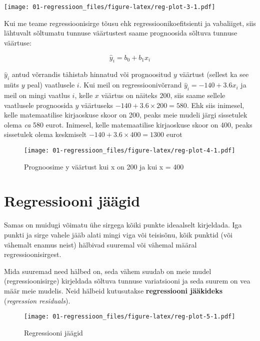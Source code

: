 \documentclass[
]{book}
\begin{document}
\texttt{[image: 01-regressioon\_files/figure-latex/reg-plot-3-1.pdf]}

Kui me teame regressioonisirge tõusu ehk regressioonikoefitsienti ja vabaliiget, siis lähtuvalt sõltumatu tunnuse väärtustest saame prognoosida sõltuva tunnuse väärtuse:

\begin{equation}
  \hat{y}_i=b_0+b_1x_i
\end{equation}

\(\hat{y}_i\) antud võrrandis tähistab hinnatud või prognoositud \(y\) väärtust (sellest ka see müts \(y\) peal) vaatlusele \(i\). Kui meil on regressioonivõrrand \(\hat{y}_i=-140+3.6x_i\) ja meil on mingi vaatlus \(i\), kelle \(x\) väärtus on näiteks \(200\), siis saame sellele vaatlusele prognoosida \(y\) väärtuseks \(-140+3.6\times200=580\). Ehk siis inimesel, kelle matemaatilise kirjaoskuse skoor on 200, peaks meie mudeli järgi sissetulek olema \emph{ca} 580 eurot. Inimesel, kelle matemaatilise kirjaoskuse skoor on 400, peaks sissetulek olema keskmiselt \(-140+3.6\times400=1300\) eurot

\begin{figure}
\centering
\texttt{[image: 01-regressioon\_files/figure-latex/reg-plot-4-1.pdf]}
\caption{\label{fig:reg-plot-4}Prognoosime y väärtust kui x on 200 ja kui x = 400}
\end{figure}

\hypertarget{regressiooni-juxe4uxe4gid}{%
\section{Regressiooni jäägid}\label{regressiooni-juxe4uxe4gid}}

Samas on muidugi võimatu ühe sirgega kõiki punkte ideaalselt kirjeldada. Iga punkti ja sirge vahele jääb alati mingi viga või teisisõnu, kõik punktid (või vähemalt enamus neist) hälbivad suuremal või vähemal määral regressioonisirgest.

Mida suuremad need hälbed on, seda vähem suudab on meie mudel (regressioonisirge) kirjeldada sõltuva tunnuse variatsiooni ja seda suurem on vea määr meie mudelis. Neid hälbeid kutusutakse \textbf{regressiooni jääkideks} (\emph{regression residuals}).

\begin{figure}
\centering
\texttt{[image: 01-regressioon\_files/figure-latex/reg-plot-5-1.pdf]}
\caption{\label{fig:reg-plot-5}Regressiooni jäägid}
\end{figure}
\end{document}

